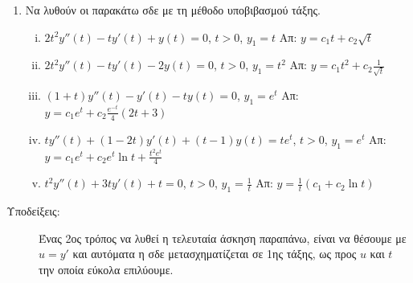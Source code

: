 



\pagestyle{askhseis}
\everymath{\displaystyle}



\begin{center}
\end{center}

\vspace{\baselineskip}

\begin{enumerate}
  \item Να λυθούν οι παρακάτω σδε με τη μέθοδο υποβιβασμού τάξης.

    \begin{enumerate}[(i)]
      \item $ 2t^{2}y''(t) - ty'(t)+y(t)=0 $,\; $ t>0 $,\; $ y_{1}=t $ 
        \hfill Απ: $ y= c_{1}t + c_{2} \sqrt{t} $ 
      \item $ 2t^{2}y''(t) - ty'(t) - 2y(t) = 0 $,\; $ t>0 $,\; $ y_{1} = t^{2} $ 
        \hfill Απ: $ y= c_{1}t^{2}+ c_{2} \frac{1}{\sqrt{t}} $
      \item $ (1+t)y''(t)-y'(t)-ty(t) = 0 $,\; $ y_{1}=e^{t} $ 
        \hfill Απ: $ y= c_{1}e^{t} + c_{2} \frac{e^{-t}}{4} (2t+3) $ 
      \item $ ty''(t)+(1-2t)y'(t)+(t-1)y(t)=te^{t} $,\; $ t>0 $,\; $ y_{1}=e^{t} $ 
        \hfill Απ: $ y = c_{1}e^{t}+ c_{2}e^{t} \ln{t} + \frac{t^{2} e^{t}}{4} $ 
      \item $ t^{2}y''(t)+3ty'(t)+t=0 $,\; $ t>0 $,\; $ y_{1}= \frac{1}{t} $ 
        \hfill Απ: $ y = \frac{1}{t} (c_{1}+ c_{2} \ln{t}) $ 
    \end{enumerate}
\end{enumerate}


\vspace{\baselineskip}

\begin{description}
  \item[Υποδείξεις:] Ένας 2ος τρόπος να λυθεί η τελευταία άσκηση παραπάνω, 
    είναι να θέσουμε με $ u=y' $ και αυτόματα η σδε μετασχηματίζεται σε 1ης τάξης, 
    ως προς $u$ και $t$ την οποία εύκολα επιλύουμε.
\end{description}


